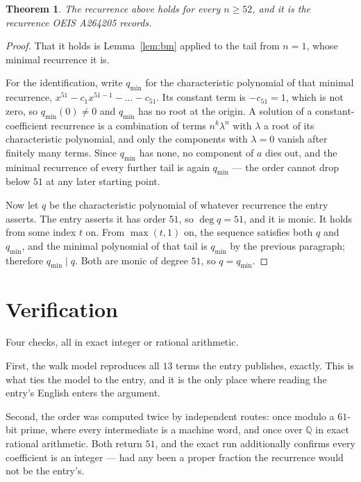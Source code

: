 \documentclass[11pt,a4paper]{article}
\theoremstyle{plain}
\newtheorem{theorem}{Theorem}
\theoremstyle{definition}
\begin{document}
\begin{theorem}
The recurrence above holds for every $n\ge52$, and it is the recurrence OEIS A264205 records.
\end{theorem}

\begin{proof}
That it holds is Lemma~\ref{lem:bm} applied to the tail from $n=1$, whose minimal
recurrence it is.

For the identification, write $q_{\min}$ for the characteristic polynomial of that minimal
recurrence, $x^{51}-c_1x^{51-1}-\dots-c_{51}$. Its constant term is
$-c_{51}=1$, which is not zero, so $q_{\min}(0)\neq0$ and $q_{\min}$ has no
root at the origin. A solution of a constant-coefficient recurrence is a combination of terms
$n^{k}\lambda^{n}$ with $\lambda$ a root of its characteristic polynomial, and only the
components with $\lambda=0$ vanish after finitely many terms. Since $q_{\min}$ has none, no
component of $a$ dies out, and the minimal recurrence of every further tail is again
$q_{\min}$ --- the order cannot drop below $51$ at any later starting point.

Now let $q$ be the characteristic polynomial of whatever recurrence the entry asserts. The
entry asserts it has order $51$, so $\deg q=51$, and it is monic. It holds from some
index $t$ on. From $\max(t,1)$ on, the sequence satisfies both $q$ and $q_{\min}$, and
the minimal polynomial of that tail is $q_{\min}$ by the previous paragraph; therefore
$q_{\min}\mid q$. Both are monic of degree $51$, so $q=q_{\min}$.
\end{proof}

\section{Verification}

Four checks, all in exact integer or rational arithmetic.

First, the walk model reproduces all $13$ terms the entry publishes, exactly. This is
what ties the model to the entry, and it is the only place where reading the entry's English
enters the argument.

Second, the order was computed twice by independent routes: once modulo a $61$-bit prime, where
every intermediate is a machine word, and once over $\mathbb{Q}$ in exact rational arithmetic.
Both return $51$, and the exact run additionally confirms every coefficient is an integer
--- had any been a proper fraction the recurrence would not be the entry's.
\end{document}
